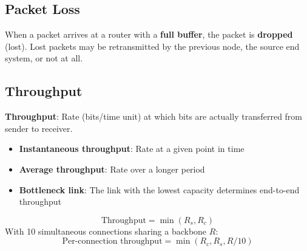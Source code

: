 \begin{center}
\end{center}

\subsection{Packet Loss}

When a packet arrives at a router with a \textbf{full buffer}, the packet is \textbf{dropped} (lost). Lost packets may be retransmitted by the previous node, the source end system, or not at all.

\subsection{Throughput}

\begin{keybox}
\textbf{Throughput}: Rate (bits/time unit) at which bits are actually transferred from sender to receiver.
\begin{itemize}[noitemsep]
    \item \textbf{Instantaneous throughput}: Rate at a given point in time
    \item \textbf{Average throughput}: Rate over a longer period
    \item \textbf{Bottleneck link}: The link with the lowest capacity determines end-to-end throughput
\end{itemize}
\[
\text{Throughput} = \min(R_s, R_c)
\]
With 10 simultaneous connections sharing a backbone $R$:
\[
\text{Per-connection throughput} = \min(R_c, R_s, R/10)
\]
\end{keybox}

